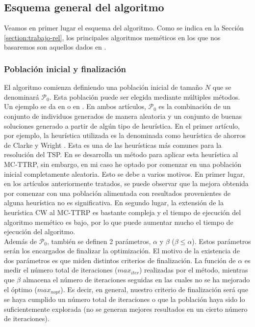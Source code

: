 \subsection{Esquema general del algoritmo}
Veamos en primer lugar el esquema del algoritmo. Como se indica en la Sección \ref{section:trabajo-rel}, los principales algoritmos meméticos en los que nos basaremos son aquellos dados en \cite{MC-VRP-Memetic-ElFallahi,MC-VRP-Stochastic-Mendoza}.\\
\subsubsection{Población inicial y finalización}

El algoritmo comienza definiendo una población inicial de tamaño $N$ que se denominará $\mathscr{P}_0$. Esta población puede ser elegida mediante múltiples métodos. Un ejemplo se da en \cite{ttrp-memetic} o en \cite{MC-VRP-Memetic-ElFallahi}. En ambos artículos, $\mathscr{P}_0$ es la combinación de un conjunto de individuos generados de manera aleatoria y un conjunto de buenas soluciones generado a partir de algún tipo de heurística. En el primer artículo, por ejemplo, la heurística utilizada es la denominada como heurística de ahorros de Clarke y Wright \cite{clarke-1964}. Esta es una de las heurísticas más comunes para la resolución del TSP. En \cite{laura-mcttrp} se desarrolla un método para aplicar esta heurística al MC-TTRP, sin embargo, en mi caso he optado por comenzar en una población inicial completamente aleatoria. Esto se debe a varios motivos. En primer lugar, en los artículos anteriormente tratados, se puede observar que la mejora obtenida por comenzar con una población alimentada con resultados provenientes de alguna heurística no es significativa. En segundo lugar, la extensión de la heurística CW al MC-TTRP es bastante compleja y el tiempo de ejecución del algoritmo memético es bajo, por lo que puede aumentar mucho el tiempo de ejecución del algoritmo.\\

Además de $\mathscr{P}_0$, también se definen 2 parámetros, $\alpha$ y $\beta$ ($\beta\leq\alpha$). Estos parámetros serán los encargados de finalizar la optimización. El motivo de la existencia de dos parámetros es que miden distintos criterios de finalización. La función de $\alpha$ es medir el número total de iteraciones ($max_{iter}$) realizadas por el método, mientras que $\beta$ almacena el número de iteraciones seguidas en las cuales no se ha mejorado el óptimo ($max_{nopt}$). Es decir, en general, nuestro criterio de finalización será que se haya cumplido un número total de iteraciones o que la población haya sido lo suficientemente explorada (no se generan mejores resultados en un cierto número de iteraciones).\\

